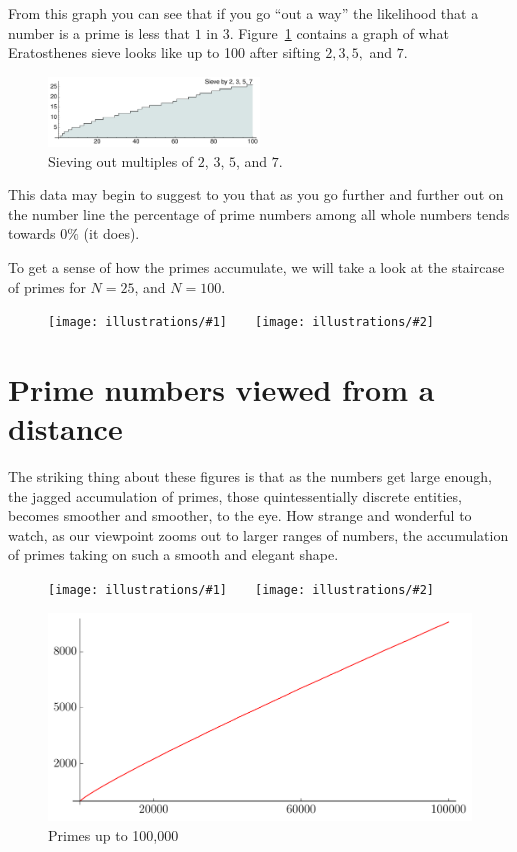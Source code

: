\documentclass[11pt]{article}
\newcommand{\illtwo}[4]{ 
   \begin{figure}[htbp]
   \begin{center}
   \texttt{[image: illustrations/\#1]}$\qquad$\texttt{[image: illustrations/\#2]}
   \caption{#4}
    \end{center}
    \end{figure}
}
\theoremstyle{plain}
\theoremstyle{definition}
\numberwithin{equation}{section}
\numberwithin{figure}{section}
\numberwithin{table}{section}
\begin{document}
From this graph you can see that if you go ``out a way'' the
likelihood that a number is a prime is less that $1$ in $3
$. Figure~\ref{fig:sieve7_100} contains a graph of what Eratosthenes
sieve looks like up to 100 after sifting $2,3,5,$ and $7$.


\begin{figure}[h]
\begin{center}
\includegraphics[width=0.5\textwidth]{illustrations/sieves7_100}
\caption{Sieving out multiples of $2$, $3$, $5$, and $7$.\label{fig:sieve7_100}}
\end{center}
\end{figure}


This data may begin to suggest to you that as you go further and
further out on the number line the percentage of prime numbers among
all whole numbers tends towards $0\%$ (it does).
  

To get a sense of how the primes accumulate, we will take a look at
the staircase of primes for $N= 25$, and $N=100$.


\illtwo{PN_25}{PN_100}{.33}{}

    
    
\section{Prime numbers viewed from a distance}
The striking thing about these figures is that as the numbers get
large enough, the jagged accumulation of primes, those
quintessentially discrete entities, becomes smoother and smoother, to
the eye. How strange and wonderful to watch, as our viewpoint zooms
out to larger ranges of numbers, the accumulation of primes taking on
such a smooth and elegant shape.

\illtwo{PN_1000}{PN_10000}{.33}{}

   \begin{figure}[htbp]
   \begin{center}
   \includegraphics[width=.7\textwidth]{illustrations/PN_100000}
   \caption{Primes up to 100,000\label{fig:pn100000}}
   \end{center}
    \end{figure}
\end{document}
